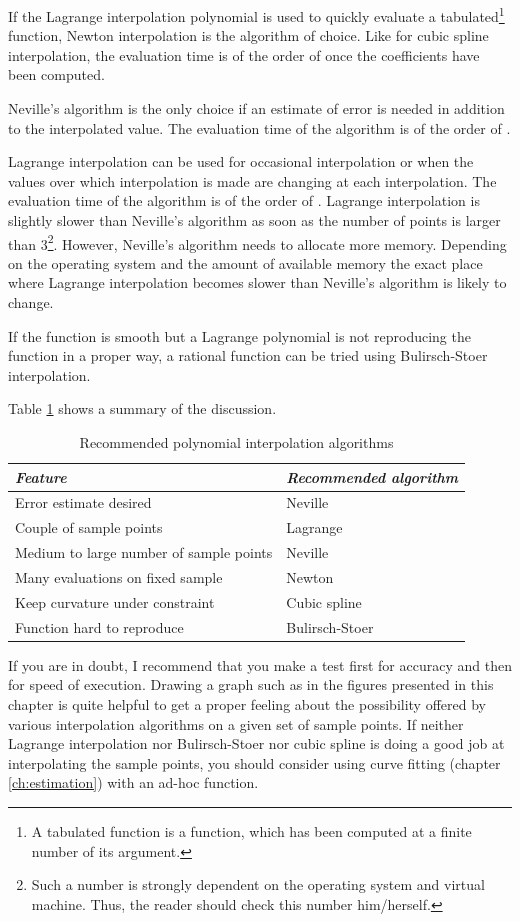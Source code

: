 \documentclass[twoside]{book}
\begin{document}
If the Lagrange interpolation polynomial is used to quickly
evaluate a tabulated\footnote{A tabulated function is a function,
which has been computed at a finite number of its argument.}
function, Newton interpolation is the algorithm of choice. Like
for cubic spline interpolation, the evaluation time is of the
order of  once the coefficients have been computed.

Neville's algorithm is the only choice if an estimate of error is
needed in addition to the interpolated value. The evaluation time
of the algorithm is of the order of .

Lagrange interpolation can be used for occasional interpolation or
when the values over which interpolation is made are changing at
each interpolation. The evaluation time of the algorithm is of the
order of . Lagrange interpolation is slightly slower than
Neville's algorithm as soon as the number of points is larger than
3\footnote{\label{ft:lagnev}Such a number is strongly dependent on
the operating system and virtual machine. Thus, the reader should
check this number him/herself.}. However, Neville's algorithm
needs to allocate more memory. Depending on the operating system
and the amount of available memory the exact place where Lagrange
interpolation becomes slower than Neville's algorithm is likely to
change.

If the function is smooth but a Lagrange polynomial is not
reproducing the function in a proper way, a rational function can
be tried using Bulirsch-Stoer interpolation.

Table \ref{tb:interpol} shows a summary of the discussion.
\begin{table}[h]
  \centering
  \caption{Recommended polynomial interpolation algorithms}\label{tb:interpol}
  \vspace{1 ex}
\begin{tabular}{|l|l|} \hline
  {\sl Feature} & {\sl Recommended algorithm} \\ \hline
  Error estimate desired&Neville\\ \hline
  Couple of sample points&Lagrange \\ \hline
  Medium to large number of sample points&Neville \\ \hline
  Many evaluations on fixed sample&Newton\\ \hline
  Keep curvature under constraint&Cubic spline\\ \hline
  Function hard to reproduce&Bulirsch-Stoer\\ \hline
\end{tabular}
\end{table}
If you are in doubt, I recommend that you make a test first for
accuracy and then for speed of execution. Drawing a graph such as
in the figures presented in this chapter is quite helpful to get a
proper feeling about the possibility offered by various
interpolation algorithms on a given set of sample points. If
neither Lagrange interpolation nor Bulirsch-Stoer nor cubic spline
is doing a good job at interpolating the sample points, you should
consider using curve fitting (\cf chapter \ref{ch:estimation})
with an ad-hoc function.

\ifx\wholebook\relax\else
\end{document}
